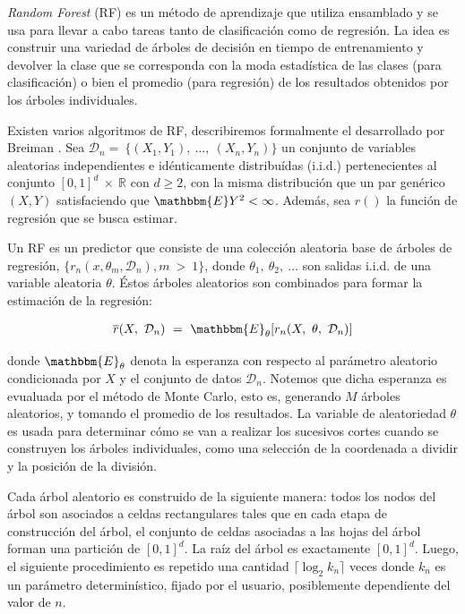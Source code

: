     \par \textit{Random Forest} (RF) es un método de aprendizaje que utiliza ensamblado y se
      usa para llevar a cabo tareas tanto de clasificación como de regresión.
      La idea es construir una variedad de árboles de decisión en tiempo de entrenamiento
      y devolver la clase que se corresponda con la moda estadística de las clases
      (para clasificación) o bien el promedio (para regresión) de los resultados
      obtenidos por los árboles individuales.

    \par Existen varios algoritmos de RF, describiremos formalmente el desarrollado
      por Breiman \cite{random_forest}.
      Sea $\mathcal{D}_{n} = \ \{ (X_{1}, Y_{1}), \ \dots, \ (X_{n}, Y_{n})\}$
      un conjunto de variables aleatorias independientes e idénticamente distribuídas (i.i.d.)
      pertenecientes al conjunto $[0,1]^{d} \ \times \ \mathbb{R} $ con $d \geq 2$,
      con la misma distribución que un par genérico $(X,Y)$ satisfaciendo que
      $\mathbbm{E}Y^{2} < \infty$. Además, sea $r()$ la función de regresión que se busca estimar.

    \par Un RF es un predictor que consiste de una colección aleatoria base
      de árboles de regresión, $\{ r_{n}(x, \theta_{m}, \mathcal{D}_{n}), m \ > \ 1 \}$, donde
      $\theta_{1},\ \theta_{2},\ \dots$ son salidas i.i.d. de una variable aleatoria
      $\theta$. Éstos árboles aleatorios son combinados para formar la estimación
      de la regresión:

      \begin{align}
        \overline{r}(X,\ \mathcal{D}_{n})\ =\ \mathbbm{E}_{\theta}[r_{n}(X,\ \theta,\ \mathcal{D}_{n})]
      \end{align}

      donde $\mathbbm{E}_{\theta}$ denota la esperanza con respecto al parámetro aleatorio
      condicionada por $X$ y el conjunto de datos $\mathcal{D}_{n}$. Notemos que
      dicha esperanza es evualuada por el método de Monte Carlo\cite{monte_carlo},
      esto es, generando $M$ árboles aleatorios, y tomando el promedio de los resultados.
      La variable de aleatoriedad $\theta$ es usada para determinar cómo se van a realizar los
      sucesivos cortes cuando se construyen los árboles individuales, como una selección
      de la coordenada a dividir y la posición de la división.

    \par Cada árbol aleatorio es construido de la siguiente manera: todos los nodos
      del árbol son asociados a celdas rectangulares tales que en cada etapa de
      construcción del árbol, el conjunto de celdas asociadas a las hojas del árbol
      forman una partición de $[0, 1]^{d}$. La raíz del árbol es exactamente $[0, 1]^{d}$.
      Luego, el siguiente procedimiento es repetido una cantidad $\lceil \log_{2}k_{n} \rceil$ veces
      donde $k_{n}$ es un parámetro determinístico, fijado por el usuario, posiblemente
      dependiente del valor de $n$.

